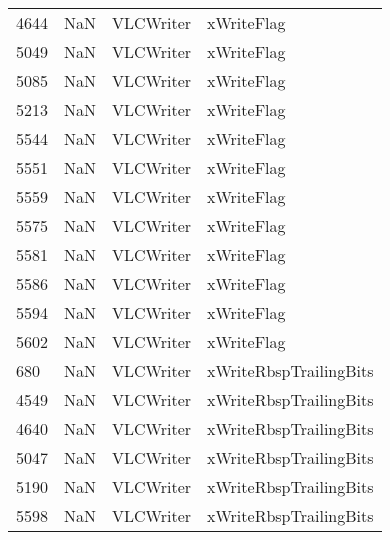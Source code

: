 \begin{tabular}{llll}
4644 &                   NaN &                  VLCWriter &                                xWriteFlag \\
5049 &                   NaN &                  VLCWriter &                                xWriteFlag \\
5085 &                   NaN &                  VLCWriter &                                xWriteFlag \\
5213 &                   NaN &                  VLCWriter &                                xWriteFlag \\
5544 &                   NaN &                  VLCWriter &                                xWriteFlag \\
5551 &                   NaN &                  VLCWriter &                                xWriteFlag \\
5559 &                   NaN &                  VLCWriter &                                xWriteFlag \\
5575 &                   NaN &                  VLCWriter &                                xWriteFlag \\
5581 &                   NaN &                  VLCWriter &                                xWriteFlag \\
5586 &                   NaN &                  VLCWriter &                                xWriteFlag \\
5594 &                   NaN &                  VLCWriter &                                xWriteFlag \\
5602 &                   NaN &                  VLCWriter &                                xWriteFlag \\
680  &                   NaN &                  VLCWriter &                    xWriteRbspTrailingBits \\
4549 &                   NaN &                  VLCWriter &                    xWriteRbspTrailingBits \\
4640 &                   NaN &                  VLCWriter &                    xWriteRbspTrailingBits \\
5047 &                   NaN &                  VLCWriter &                    xWriteRbspTrailingBits \\
5190 &                   NaN &                  VLCWriter &                    xWriteRbspTrailingBits \\
5598 &                   NaN &                  VLCWriter &                    xWriteRbspTrailingBits \\

\end{tabular}
